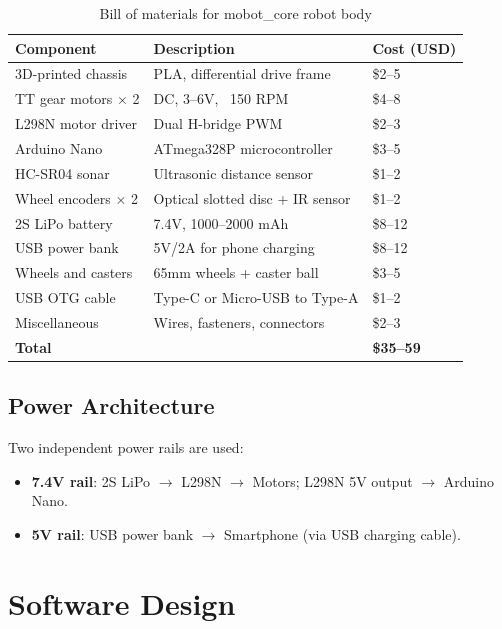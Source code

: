 \documentclass[12pt,a4paper]{article}
\begin{document}
\begin{table}[h!]
\centering
\begin{tabular}{lll}
\toprule
\textbf{Component} & \textbf{Description} & \textbf{Cost (USD)} \\
\midrule
3D-printed chassis & PLA, differential drive frame & \$2--5 \\
TT gear motors $\times$ 2 & DC, 3--6V, ~150 RPM & \$4--8 \\
L298N motor driver & Dual H-bridge PWM & \$2--3 \\
Arduino Nano & ATmega328P microcontroller & \$3--5 \\
HC-SR04 sonar & Ultrasonic distance sensor & \$1--2 \\
Wheel encoders $\times$ 2 & Optical slotted disc + IR sensor & \$1--2 \\
2S LiPo battery & 7.4V, 1000--2000 mAh & \$8--12 \\
USB power bank & 5V/2A for phone charging & \$8--12 \\
Wheels and casters & 65mm wheels + caster ball & \$3--5 \\
USB OTG cable & Type-C or Micro-USB to Type-A & \$1--2 \\
Miscellaneous & Wires, fasteners, connectors & \$2--3 \\
\midrule
\textbf{Total} & & \textbf{\$35--59} \\
\bottomrule
\end{tabular}
\caption{Bill of materials for mobot\_core robot body}
\end{table}

\subsection{Power Architecture}

Two independent power rails are used:
\begin{itemize}
    \item \textbf{7.4V rail}: 2S LiPo $\rightarrow$ L298N $\rightarrow$ Motors; L298N 5V output
          $\rightarrow$ Arduino Nano.
    \item \textbf{5V rail}: USB power bank $\rightarrow$ Smartphone (via USB charging cable).
\end{itemize}

\section{Software Design}
\label{sec:software}
\end{document}

